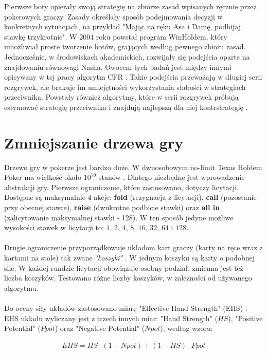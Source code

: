 \documentclass[magisterska]{pracamgr}
\begin{document}
Pierwsze boty opierały swoją strategię na zbiorze zasad wpisanych ręcznie przez pokerowych graczy. Zasady określały
sposób podejmowania decyzji w konkretnych sytuacjach, na przykład "Mając na ręku Asa i Damę, podbijaj stawkę trzykrotnie".
W 2004 roku powstał program WinHoldem, który umożliwiał proste tworzenie botów, grających według pewnego zbioru zasad.
Jednocześnie, w środowiskach akademickich, rozwijały się podejścia oparte na znajdowaniu równowagi Nasha. Owocem tych
badań jest między innymi opisywany w tej pracy algorytm CFR \cite{cfr, cfr2, cfr3}. Takie podejścia przeważają w długiej serii rozgrywek, ale
brakuje im umiejętności wykorzystania słabości w strategiach przeciwnika. Powstały również algorytmy, które w serii
rozgrywek próbują estymować strategię przeciwnika i znajdują najlepszą dla niej kontrstrategię \cite{exploit}.

\section{Zmniejszanie drzewa gry}

Drzewo gry w pokerze jest bardzo duże. W dwuosobowym no-limit Texas Holdem Poker ma wielkość
około $10^{70}$ stanów \cite{monte-carlo}. Dlatego niezbędne jest wprowadzenie abstrakcji gry.
Pierwsze ograniczenie, które zastosowano, dotyczy licytacji. Dostępne są maksymalnie 4 akcje:
\textbf{fold} (rezygnacja z licytacji), \textbf{call} (pozostanie przy obecnej stawce), \textbf{raise} (dwukrotne podbicie stawki) oraz
\textbf{all in} (zalicytowanie maksymalnej stawki - 128). W ten sposób jedyne możliwe wysokości stawek w licytacji to: $1$, $2$,
$4$, $8$, $16$, $32$, $64$ i $128$. \\\\
\noindent
Drugie ograniczenie przyporządkowuje układom kart graczy (karty na ręce wraz z kartami na stole) tak zwane \emph{"koszyki"} \cite[punkt 4.4]{buckets}.
W jednym koszyku są karty o podobnej sile. W każdej rundzie licytacji obowiązuje osobny podział, zmienna
jest też liczba koszyków. Testowano różne liczby koszyków, w zależności od używanego algorytmu. \\\\
\noindent
Do oceny siły układów zastosowano miarę "Effective Hand Strength" (EHS) \cite{ehs}. EHS układu wyliczany
jest z trzech innych miar: "Hand Strength" ($HS$), "Positive Potential" ($Ppot$) oraz "Negative Potential" ($Npot$), według
wzoru:

\begin{align*}
EHS = HS \cdot (1 - Npot) + (1 - HS) \cdot Ppot
\end{align*}
\end{document}
